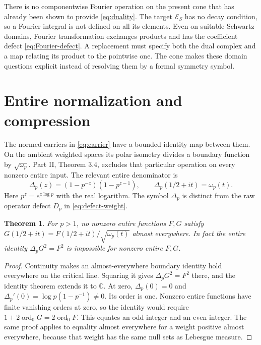 \documentclass[11pt,letterpaper]{article}
\newtheorem{theorem}{Theorem}[section]
\theoremstyle{definition}
\theoremstyle{remark}
\newcommand{\C}{\mathbb C}
\newcommand{\ord}{\operatorname{ord}}
\begin{document}
There is no componentwise Fourier operation on the present cone
that has already been shown to provide \eqref{eq:duality}.
The target $\mathscr E_S$ has no decay condition, so a Fourier
integral is not defined on all its elements. Even on suitable
Schwartz domains, Fourier transformation exchanges products and
has the coefficient defect \eqref{eq:Fourier-defect}. A replacement
must specify both the dual complex and a map relating its product
to the pointwise one. The cone makes these domain questions
explicit instead of resolving them by a formal symmetry symbol.

\section{Entire normalization and compression}

The normed carriers in \eqref{eq:carrier} have a bounded identity
map between them. On the ambient weighted spaces its polar
isometry divides a boundary function by $\sqrt{\omega_p}$.
Part II, Theorem 3.4, excludes that particular operation on every
nonzero entire input. The relevant entire denominator is
\begin{equation}
 \Delta_p(z)=(1-p^{-z})(1-p^{z-1}),\qquad
 \Delta_p(1/2+it)=\omega_p(t).
 \label{eq:Delta}
\end{equation}
Here $p^z=e^{z\log p}$ with the real logarithm.
The symbol $\Delta_p$ is distinct from the raw operator defect
$D_p$ in \eqref{eq:defect-weight}.

\begin{theorem}\label{thm:entire}
For $p>1$, no nonzero entire functions $F,G$ satisfy
$G(1/2+it)=F(1/2+it)/\sqrt{\omega_p(t)}$ almost everywhere.
In fact the entire identity $\Delta_pG^2=F^2$ is impossible
for nonzero entire $F,G$.
\end{theorem}
\begin{proof}
Continuity makes an almost-everywhere boundary identity hold
everywhere on the critical line. Squaring it gives
$\Delta_pG^2=F^2$ there, and the identity theorem extends it to
$\C$. At zero, $\Delta_p(0)=0$ and
$\Delta_p'(0)=\log p(1-p^{-1})\ne0$. Its order is one.
Nonzero entire functions have finite vanishing orders at zero,
so the identity would require
$1+2\ord_0G=2\ord_0F$. This equates an odd integer and an even
integer. The same proof applies to equality almost everywhere
for a weight positive almost everywhere, because that weight
has the same null sets as Lebesgue measure.
\end{proof}
\end{document}
